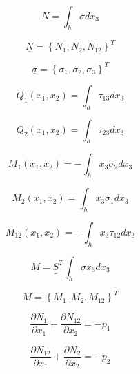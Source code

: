 		\begin{equation}
		  \underline{N} = \int_h \underline{\sigma} dx_3
		\end{equation}

		\begin{equation}\label{eq:2.62}
		  \underline{N} = \left\{ N_1, N_2, N_{12} \right\}^T
		\end{equation}

		\begin{equation}\label{eq:2.64}
		  \underline{\sigma} = \left\{ \sigma_1, \sigma_2, \sigma_3 \right\}^T
		\end{equation}

		\begin{equation}
		  Q_1(x_1,x_2) = \int_h \tau_{13} dx_3
		\end{equation}

		\begin{equation}
		  Q_2(x_1,x_2) = \int_h \tau_{23} dx_3
		\end{equation}

		\begin{equation}
		  M_1(x_1,x_2) = -\int_h x_3 \sigma_2 dx_3
		\end{equation}

		\begin{equation}
		  M_2(x_1,x_2) = \int_h x_3 \sigma_1 dx_3
		\end{equation}

		\begin{equation}
		  M_{12}(x_1,x_2) = -\int_h x_3 \tau_{12} dx_3
		\end{equation}

		\begin{equation}
		  \underline{M} = \underline{\underline{S}}^T \int_h \underline{\sigma} x_3 dx_3
		\end{equation}

		\begin{equation}
		  \underline{M} = \left\{ M_1, M_2, M_{12} \right\}^T
		\end{equation}

		\begin{equation}\label{eq2.88}
		  \frac{\partial N_1}{\partial x_1} + \frac{\partial N_{12}}{\partial x_2} = -p_1
		\end{equation}

		\begin{equation}\label{eq2.89}
		  \frac{\partial N_{12}}{\partial x_1} + \frac{\partial N_{2}}{\partial x_2} = -p_2
		\end{equation}

